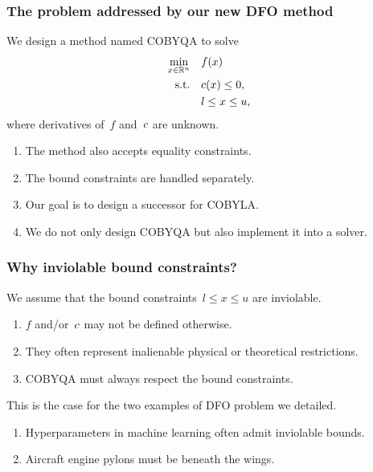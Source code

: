 \documentclass{polyu-presentation}
\newcommand{\con}[1][]{c\ifthenelse{\equal{#1}{}}{}{_{#1}}}
\newcommand{\obj}{f}
\newcommand{\xl}{l}
\newcommand{\xu}{u}
\begin{document}
\begin{frame}
    \frametitle{The problem addressed by our new DFO method}
    
	We design a method named \alert{COBYQA} to solve
    \begin{align*}
        \min_{x \in \R^n}   & \quad \obj(x)\\
        \text{s.t.}         & \quad \con(x) \le 0,\\
                            & \quad \xl \le x \le \xu,
    \end{align*}
    where derivatives of~$\obj$ and~$\con$ are \alert{unknown}.

    \bigskip

    \begin{block}{}
        \begin{enumerate}
            \item The method also accepts \alert{equality constraints}.
            \item The bound constraints are handled separately.
            \item Our goal is to design a \alert{successor} for COBYLA.
            \item We do not only design COBYQA but also implement it into a solver.
        \end{enumerate}
    \end{block}
\end{frame}

\begin{frame}
    \frametitle{Why inviolable bound constraints?}
    
	\begin{block}{}
        We assume that the bound constraints~$\xl \le x \le \xu$ are \alert{inviolable}.
        \begin{enumerate}
            \item $f$ and/or~$\con$ may \alert{not} be defined otherwise.
            \item They often represent inalienable physical or theoretical restrictions.
            \item COBYQA must \alert{always} respect the bound constraints.
        \end{enumerate}
    \end{block}

    \bigskip

    This is the case for the two examples of DFO problem we detailed.
    \begin{enumerate}
        \item Hyperparameters in machine learning often admit inviolable bounds.
        \item Aircraft engine pylons must be beneath the wings.
    \end{enumerate}
\end{frame}
\end{document}
